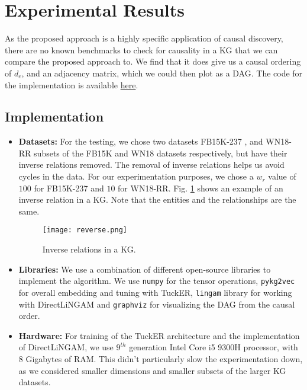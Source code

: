 \documentclass{article}
\begin{document}
\section{Experimental Results} \label{results}
As the proposed approach is a highly specific application of causal discovery, there are no known benchmarks to check for causality in a KG that we can compare the proposed approach to. We find that it does give us a causal ordering of $d_e$, and an adjacency matrix, which we could then plot as a DAG. The code for the implementation is available  \href{https://www.github.com/rohangiriraj/CausalKG}{here}.


\subsection{Implementation}
\begin{itemize}
    \item \textbf{Datasets:} For the testing, we chose two datasets FB15K-237 \cite{fb15k-237}, and WN18-RR \cite{wn18rr} subsets of the FB15K \cite{fb15k} and WN18 \cite{fb15k} datasets respectively, but have their inverse relations removed. The removal of inverse relations helps us avoid cycles in the data. For our experimentation purposes, we chose a $w_r$ value of $100$ for FB15K-237 and $10$ for WN18-RR.
    Fig. \ref{inverse} shows an example of an inverse relation in a KG.  Note that the entities and the relationships are the same.
    \begin{figure}[h!]
        \centering
        \texttt{[image: reverse.png]}
        \caption{Inverse relations in a KG.}
        \label{inverse}
    \end{figure}
    
    
    \item \textbf{Libraries:} We use a combination of different open-source libraries to implement the algorithm. We use \texttt{numpy} \cite{harris2020array} for the tensor operations, \texttt{pykg2vec} \cite{pykg2vec} for overall embedding and tuning with TuckER, \texttt{lingam} \cite{JMLR:v7:shimizu06a} library for working with DirectLiNGAM and \texttt{graphviz} for visualizing the DAG from the causal order. 
    
    \item \textbf{Hardware:} For training of the TuckER architecture and the implementation of DirectLiNGAM, we use $9^{th}$ generation Intel Core i5 9300H processor, with 8 Gigabytes of RAM. This didn't particularly slow the experimentation down, as we considered smaller dimensions and smaller subsets of the larger KG datasets.
\end{itemize}
\end{document}
